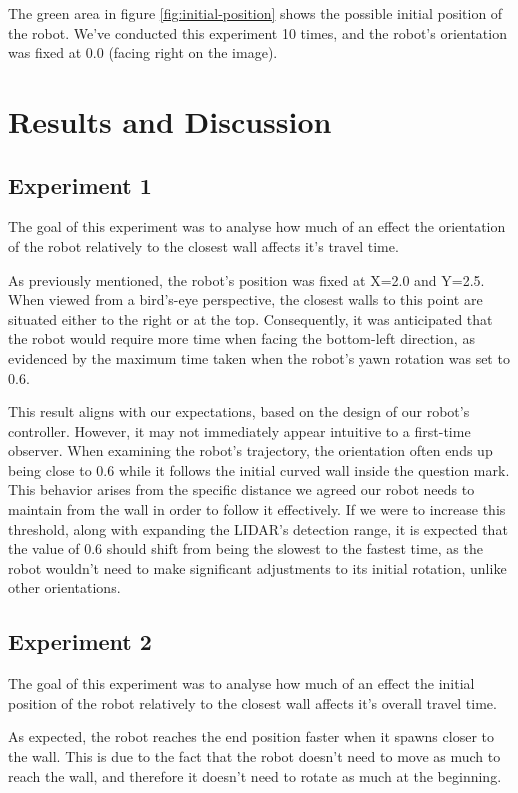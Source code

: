 \documentclass[conference]{IEEEtran}
\begin{document}
The green area in figure \ref{fig:initial-position} shows the possible initial position of the robot.
We've conducted this experiment 10 times, and the robot's orientation was fixed at 0.0 (facing right on the image).


\section{Results and Discussion}

\subsection{Experiment 1}

The goal of this experiment was to analyse how much of an effect the orientation of the robot relatively to the closest wall affects it's travel time.

As previously mentioned, the robot's position was fixed at X=2.0 and Y=2.5. When viewed from a bird's-eye perspective, the closest walls to this point are situated either to the right or at the top. Consequently, it was anticipated that the robot would require more time when facing the bottom-left direction, as evidenced by the maximum time taken when the robot's yawn rotation was set to 0.6.

This result aligns with our expectations, based on the design of our robot's controller. However, it may not immediately appear intuitive to a first-time observer. When examining the robot's trajectory, the orientation often ends up being close to 0.6 while it follows the initial curved wall inside the question mark. This behavior arises from the specific distance we agreed our robot needs to maintain from the wall in order to follow it effectively. If we were to increase this threshold, along with expanding the LIDAR's detection range, it is expected that the value of 0.6 should shift from being the slowest to the fastest time, as the robot wouldn't need to make significant adjustments to its initial rotation, unlike other orientations.

\subsection{Experiment 2}

The goal of this experiment was to analyse how much of an effect the initial position of the robot relatively to the closest wall affects it's overall travel time.

As expected, the robot reaches the end position faster when it spawns closer to the wall. 
This is due to the fact that the robot doesn't need to move as much to reach the wall, and therefore it doesn't need to rotate as much at the beginning.
\end{document}
